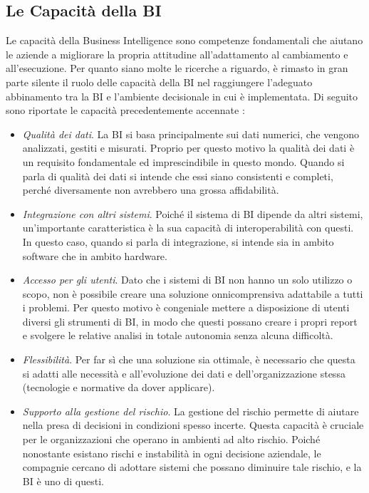 \subsection{Le Capacità della BI}

Le capacità della Business Intelligence sono competenze fondamentali che aiutano le aziende a migliorare la propria attitudine all'adattamento al cambiamento e all'esecuzione. Per quanto siano molte le ricerche a riguardo, è rimasto in gran parte silente il ruolo delle capacità della BI nel raggiungere l'adeguato abbinamento tra la BI e l'ambiente decisionale in cui è implementata. Di seguito sono riportate le capacità precedentemente accennate \cite{bi_capabilities}:

\begin{itemize}
    \item \textit{Qualità dei dati}. La BI si basa principalmente sui dati numerici, che vengono analizzati, gestiti e misurati. Proprio per questo motivo la qualità dei dati è un requisito fondamentale ed imprescindibile in questo mondo. Quando si parla di qualità dei dati si intende che essi siano consistenti e completi, perché diversamente non avrebbero una grossa affidabilità.
    \item \textit{Integrazione con altri sistemi}. Poiché il sistema di BI dipende da altri sistemi, un'importante caratteristica è la sua capacità di interoperabilità con questi. In questo caso, quando si parla di integrazione, si intende sia in ambito software che in ambito hardware.
    \item \textit{Accesso per gli utenti}. Dato che i sistemi di BI non hanno un solo utilizzo o scopo, non è possibile creare una soluzione onnicomprensiva adattabile a tutti i problemi. Per questo motivo è congeniale mettere a disposizione di utenti diversi gli strumenti di BI, in modo che questi possano creare i propri report e svolgere le relative analisi in totale autonomia senza alcuna difficoltà.
    \item \textit{Flessibilità}. Per far sì che una soluzione sia ottimale, è necessario che questa si adatti alle necessità e all'evoluzione dei dati e dell'organizzazione stessa (tecnologie e normative da dover applicare).
    \item \textit{Supporto alla gestione del rischio}. La gestione del rischio permette di aiutare nella presa di decisioni in condizioni spesso incerte. Questa capacità è cruciale per le organizzazioni che operano in ambienti ad alto rischio. Poiché nonostante esistano rischi e instabilità in ogni decisione aziendale, le compagnie cercano di adottare sistemi che possano diminuire tale rischio, e la BI è uno di questi.
\end{itemize}

